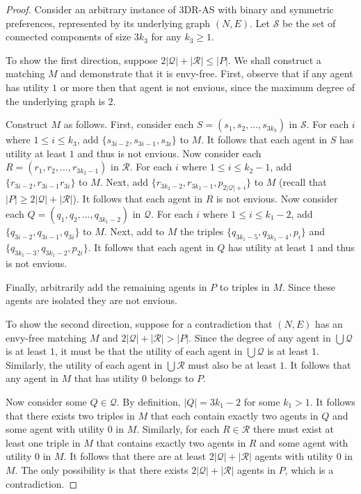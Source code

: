\begin{proof}
Consider an arbitrary instance of 3DR-AS with binary and symmetric preferences, represented by its underlying graph $(N, E)$. Let $\mathcal{S}$ be the set of connected components of size $3{k_3}$ for any ${k_3} \geq 1$.

To show the first direction, suppose $2|\mathcal{Q}| + |\mathcal{R}| \leq |P|$. We shall construct a matching $M$ and demonstrate that it is envy-free. First, observe that if any agent has utility $1$ or more then that agent is not envious, since the maximum degree of the underlying graph is $2$.

Construct $M$ as follows. First, consider each $S = ( s_1, s_2, \dots, s_{3{k_3}} )$ in $\mathcal{S}$. For each $i$ where $1\leq i\leq {k_3}$, add $\{ s_{3i-2}, s_{3i-1}, s_{3i} \}$ to $M$. It follows that each agent in $S$ has utility at least $1$ and thus is not envious. Now consider each $R = ( r_1, r_2, \dots, r_{3{k_2}-1} )$ in $\mathcal{R}$. For each $i$ where $1\leq i \leq {k_2}-1$, add $\{ r_{3i-2}, r_{3i-1} r_{3i} \}$ to $M$. Next, add $\{ r_{3{k_2}-2}, r_{3{k_2}-1}, p_{2|\mathcal{Q}|+i} \}$ to $M$ (recall that $|P| \geq 2|\mathcal{Q}| + |\mathcal{R}|$). It follows that each agent in $R$ is not envious. Now consider each $Q = ( q_1, q_2, \dots, q_{3{k_1}-2} )$ in $\mathcal{Q}$. For each $i$ where $1\leq i \leq {k_1}-2$, add $\{ q_{3i-2}, q_{3i-1}, q_{3i} \}$ to $M$. Next, add to $M$ the triples $\{ q_{3{k_1}-5}, q_{3{k_1}-4}, p_{i} \}$ and $\{ q_{3{k_1}-3}, q_{3{k_1}-2}, p_{2i} \}$. It follows that each agent in $Q$ has utility at least $1$  and thus is not envious.

Finally, arbitrarily add the remaining agents in $P$ to triples in $M$. Since these agents are isolated they are not envious.

To show the second direction, suppose for a contradiction that $(N, E)$ has an envy-free matching $M$ and $2|\mathcal{Q}| + |\mathcal{R}| > |P|$. Since the degree of any agent in $\bigcup \mathcal{Q}$ is at least $1$, it must be that the utility of each agent in $\bigcup \mathcal{Q}$ is at least $1$. Similarly, the utility of each agent in $\bigcup \mathcal{R}$ must also be at least $1$. It follows that any agent in $M$ that has utility $0$ belongs to $P$.

Now consider some $Q \in \mathcal{Q}$. By definition, $|Q| = 3{k_1} - 2$ for some ${k_1} > 1$. It follows that there exists two triples in $M$ that each contain exactly two agents in $Q$ and some agent with utility $0$ in $M$. Similarly, for each $R \in \mathcal{R}$ there must exist at least one triple in $M$ that contains exactly two agents in $R$ and some agent with utility $0$ in $M$. It follows that there are at least $2|\mathcal{Q}| + |\mathcal{R}|$ agents with utility $0$ in $M$. The only possibility is that there exists $2|\mathcal{Q}| + |\mathcal{R}|$ agents in $P$, which is a contradiction.
\end{proof}

